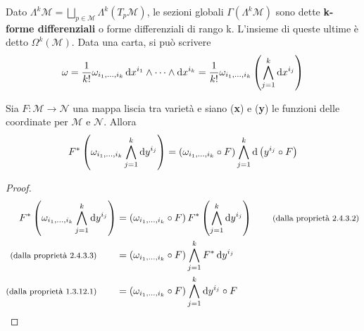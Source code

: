 \begin{definition}
    Dato $\Lambda^k \mathcal{M} = \bigsqcup_{p \in \mathcal{M}} \Lambda^k(T_p \mathcal{M})$, le sezioni globali $\Gamma(\Lambda^k \mathcal{M})$ sono dette \textbf{k-forme differenziali} o forme differenziali di rango k. L'insieme di queste ultime è detto $\Omega^k(\mathcal{M})$.
    Data una carta, si può scrivere
    \[
        \omega = \frac{1}{k!} \omega_{i_1, \dots, i_k} \odif{x^{i_1}} \wedge \cdots \wedge \odif{x^{i_k}} = \frac{1}{k!} \omega_{i_1, \dots, i_k} \left(\bigwedge_{j=1}^k \odif{x^{i_j}}\right)
    \]
\end{definition}

\begin{lemma}
    Sia $F : \mathcal{M} \longrightarrow \mathcal{N}$ una mappa liscia tra varietà e siano (\textbf{x}) e (\textbf{y}) le funzioni delle coordinate per $\mathcal{M}$ e $\mathcal{N}$. Allora
    \begin{equation}
        F^*\left(\omega_{i_1, \dots, i_k} \bigwedge_{j=1}^k \odif{y^{i_j}}\right) = \left( \omega_{i_1, \dots, i_k} \circ F\right) \bigwedge_{j=1}^k \odif{\left( y^{i_j} \circ F \right)}
    \end{equation}
    \begin{proof}
        \begin{align*}
            F^*\left(\omega_{i_1, \dots, i_k} \bigwedge_{j=1}^k \odif{y^{i_j}}\right) & = \left( \omega_{i_1, \dots, i_k} \circ F \right) F^* \left( \bigwedge_{j=1}^k \odif{y^{i_j}} \right) \qquad \text{\footnotesize{(dalla proprietà 2.4.3.2)}} \\
            \text{\footnotesize{(dalla proprietà 2.4.3.3)}} \qquad                    & = \left( \omega_{i_1, \dots, i_k} \circ F \right) \bigwedge_{j=1}^k F^*\odif{y^{i_j}}                                                                        \\
            \text{\footnotesize{(dalla proprietà 1.3.12.1)}} \qquad                   & = \left( \omega_{i_1, \dots, i_k} \circ F \right) \bigwedge_{j=1}^k \odif{y^{i_j} \circ F}
        \end{align*}
    \end{proof}
\end{lemma}

